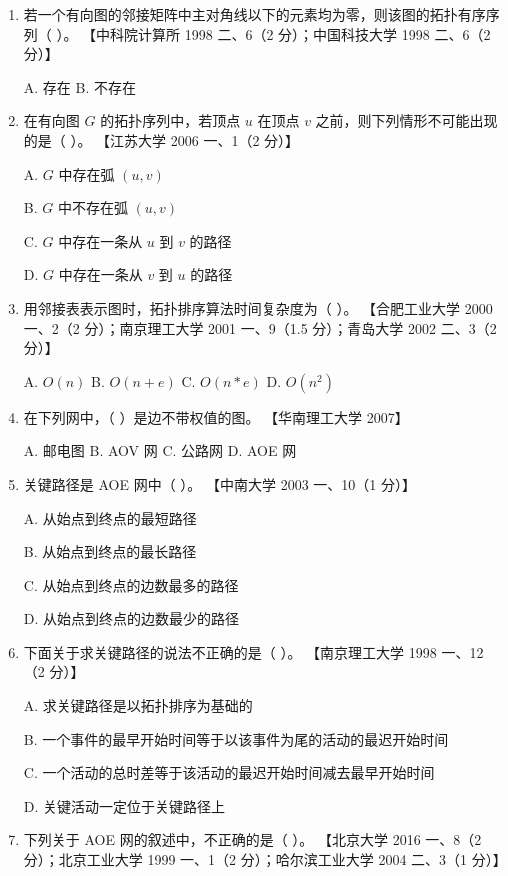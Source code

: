 \documentclass[lang=cn,newtx,10pt,scheme=chinese]{elegantbook}
\begin{document}
\begin{enumerate}
    \item 若一个有向图的邻接矩阵中主对角线以下的元素均为零，则该图的拓扑有序序列（ ）。  
    【中科院计算所 1998 二、6（2 分）；中国科技大学 1998 二、6（2 分）】  

    A. 存在 \quad B. 不存在  

    \item 在有向图 $G$ 的拓扑序列中，若顶点 $u$ 在顶点 $v$ 之前，则下列情形不可能出现的是（ ）。  
    【江苏大学 2006 一、1（2 分）】  

    A. $G$ 中存在弧 $(u, v)$  

    B. $G$ 中不存在弧 $(u, v)$  

    C. $G$ 中存在一条从 $u$ 到 $v$ 的路径  

    D. $G$ 中存在一条从 $v$ 到 $u$ 的路径  

    \item 用邻接表表示图时，拓扑排序算法时间复杂度为（ ）。  
    【合肥工业大学 2000 一、2（2 分）；南京理工大学 2001 一、9（1.5 分）；青岛大学 2002 二、3（2 分）】 

    A. $O(n)$ \quad B. $O(n+e)$ \quad C. $O(n*e)$ \quad D. $O(n^2)$  

    \item 在下列网中，（ ）是边不带权值的图。  
    【华南理工大学 2007】  

    A. 邮电图 \quad B. AOV 网 \quad C. 公路网 \quad D. AOE 网  

    \item 关键路径是 AOE 网中（ ）。  
    【中南大学 2003 一、10（1 分）】  

    A. 从始点到终点的最短路径  

    B. 从始点到终点的最长路径  

    C. 从始点到终点的边数最多的路径  

    D. 从始点到终点的边数最少的路径  

    \item 下面关于求关键路径的说法不正确的是（ ）。  
    【南京理工大学 1998 一、12（2 分）】  

    A. 求关键路径是以拓扑排序为基础的  

    B. 一个事件的最早开始时间等于以该事件为尾的活动的最迟开始时间  

    C. 一个活动的总时差等于该活动的最迟开始时间减去最早开始时间  

    D. 关键活动一定位于关键路径上  

    \item 下列关于 AOE 网的叙述中，不正确的是（ ）。  
    【北京大学 2016 一、8（2 分）；北京工业大学 1999 一、1（2 分）；哈尔滨工业大学 2004 二、3（1 分）】  


\end{enumerate}
\end{document}
